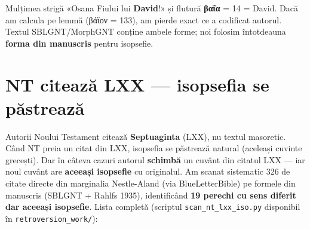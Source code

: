 \documentclass[12pt,a4paper,twoside,openany]{book}
\begin{document}
Mulțimea strigă «Osana Fiului lui \textbf{David}!» și flutură \textbf{βαΐα} = 14 = David. Dacă am calcula pe lemmă (βάϊον = 133), am pierde exact ce a codificat autorul. Textul SBLGNT/MorphGNT conține ambele forme; noi folosim întotdeauna \textbf{forma din manuscris} pentru isopsefie.

\section*{NT citează LXX --- isopsefia se păstrează}\label{nt-lxx-iso}

Autorii Noului Testament citează \textbf{Septuaginta} (LXX), nu textul masoretic. Când NT preia un citat din LXX, isopsefia se păstrează natural (aceleași cuvinte grecești). Dar în câteva cazuri autorul \textbf{schimbă} un cuvânt din citatul LXX --- iar noul cuvânt are \textbf{aceeași isopsefie} cu originalul. Am scanat sistematic 326 de citate directe din marginalia Nestle-Aland (via BlueLetterBible) pe formele din manuscris (SBLGNT + Rahlfs 1935), identificând \textbf{19 perechi cu sens diferit dar aceeași isopsefie}. Lista completă (scriptul \texttt{scan\_nt\_lxx\_iso.py} disponibil în \texttt{retroversion\_work/}):
\end{document}
